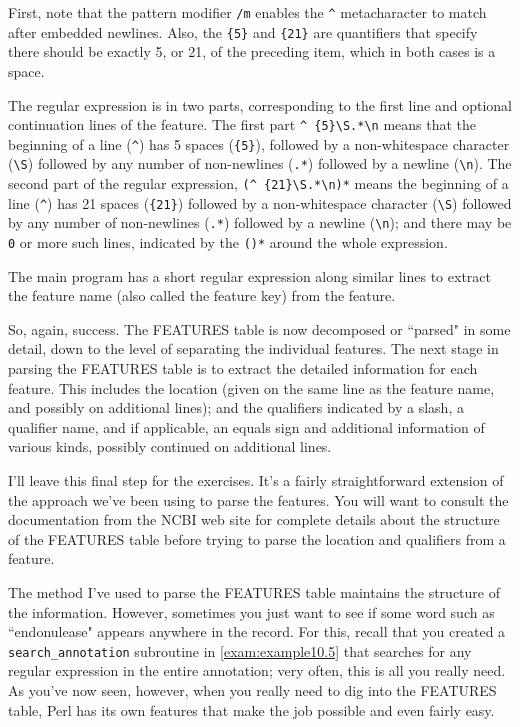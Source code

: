 First, note that the pattern modifier \verb|/m| enables the \verb|^| metacharacter to match after embedded newlines. Also, the \verb|{5}| and \verb|{21}| are quantifiers that specify there should be exactly 5, or 21, of the preceding item, which in both cases is a space.

The regular expression is in two parts, corresponding to the first line and optional continuation lines of the feature. The first part \verb|^ {5}\S.*\n| means that the beginning of a line (\verb|^|) has 5 spaces (\verb|{5}|), followed by a non-whitespace character (\verb|\S|) followed by any number of non-newlines (\verb|.*|) followed by a newline (\verb|\n|). The second part of the regular expression, \verb|(^ {21}\S.*\n)*| means the beginning of a line (\verb|^|) has 21 spaces (\verb|{21}|) followed by a non-whitespace character (\verb|\S|) followed by any number of non-newlines (\verb|.*|) followed by a newline (\verb|\n|); and there may be \verb|0| or more such lines, indicated by the \verb|()*| around the whole expression.

The main program has a short regular expression along similar lines to extract the feature name (also called the feature key) from the feature.

So, again, success. The FEATURES table is now decomposed or ``parsed" in some detail, down to the level of separating the individual features. The next stage in parsing the FEATURES table is to extract the detailed information for each feature. This includes the location (given on the same line as the feature name, and possibly on additional lines); and the qualifiers indicated by a slash, a qualifier name, and if applicable, an equals sign and additional information of various kinds, possibly continued on additional lines.

I'll leave this final step for the exercises. It's a fairly straightforward extension of the approach we've been using to parse the features. You will want to consult the documentation from the NCBI web site for complete details about the structure of the FEATURES table before trying to parse the location and qualifiers from a feature.

The method I've used to parse the FEATURES table maintains the structure of the information. However, sometimes you just want to see if some word such as ``endonulease" appears anywhere in the record. For this, recall that you created a \verb|search_annotation| subroutine in \autoref{exam:example10.5} that searches for any regular expression in the entire annotation; very often, this is all you really need. As you've now seen, however, when you really need to dig into the FEATURES table, Perl has its own features that make the job possible and even fairly easy.

